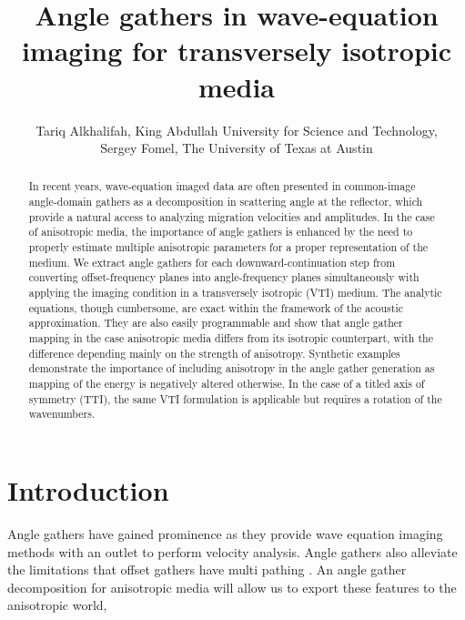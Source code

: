 


\title{Angle gathers in wave-equation imaging for transversely isotropic media}

\author{Tariq Alkhalifah, King Abdullah University for Science and Technology, \\
       Sergey Fomel, The University of Texas at Austin}
\maketitle

\begin{abstract}
  In recent years, wave-equation imaged data are often presented in common-image angle-domain gathers as a decomposition in scattering
  angle at the reflector, which provide a natural access to analyzing
  migration velocities and amplitudes. In the case of anisotropic
  media, the importance of angle gathers is enhanced by the need to
  properly estimate multiple anisotropic parameters for a proper
  representation of the medium.  We extract angle gathers for each
  downward-continuation step from converting offset-frequency
  planes into angle-frequency planes simultaneously with applying the
  imaging condition in a transversely isotropic  (VTI) medium. The
  analytic equations, though cumbersome, are exact within the
  framework of the acoustic approximation.  They are also easily
  programmable and show that angle gather mapping in the case 
  anisotropic media differs from its isotropic counterpart, with the difference
  depending mainly on the strength of anisotropy. Synthetic examples demonstrate
  the importance of including anisotropy in the angle gather generation as mapping of
  the energy is negatively altered otherwise. In the case of a titled axis of symmetry (TTI), 
the same VTI formulation is applicable but requires a rotation
  of the wavenumbers.

\end{abstract}

\section{Introduction}

Angle gathers have gained prominence as they provide  wave equation imaging methods with an outlet
to perform velocity analysis. Angle gathers also alleviate the limitations that offset gathers have
  multi pathing \cite[]{GEO55-09-12231234,SEG-2000-08300833,stolk}. An angle gather decomposition for 
anisotropic media will allow us to export these features to the anisotropic world, 

